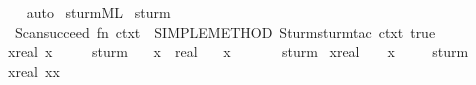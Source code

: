 \begin{isabellebody}
%
\isadelimproof
\ \ %
\endisadelimproof
%
\isatagproof
{}\isamarkupfalse%
\ auto%
\endisatagproof
{\isafoldproof}%
%
\isadelimproof
\isanewline
%
\endisadelimproof
\isanewline
%
\isadelimML
\isanewline
%
\endisadelimML
%
\isatagML
{}\isamarkupfalse%
\ {\isachardoublequoteopen}sturm{\isachardot}ML{\isachardoublequoteclose}\isanewline
\isanewline
{}\isamarkupfalse%
\ sturm\ {\isacharequal}\ {\isacharverbatimopen}\isanewline
\ \ Scan{\isachardot}succeed\ {\isacharparenleft}fn\ ctxt\ {\isacharequal}{\isachargreater}\ SIMPLE{\isacharunderscore}METHOD{\isacharprime}\ {\isacharparenleft}Sturm{\isachardot}sturm{\isacharunderscore}tac\ ctxt\ true{\isacharparenright}{\isacharparenright}\isanewline
{\isacharverbatimclose}%
\endisatagML
{\isafoldML}%
%
\isadelimML
\isanewline
%
\endisadelimML
\isanewline
{}\isamarkupfalse%
\isanewline
\ {\isachardoublequoteopen}{\isasymforall}x{\isacharcolon}{\isacharcolon}real{\isachardot}\ x{\isacharcircum}{}\ {\isacharplus}\ {}\ {\isasymnoteq}\ {}{\isachardoublequoteclose}\isanewline
%
\isadelimproof
%
\endisadelimproof
%
\isatagproof
{}\isamarkupfalse%
\ sturm%
\endisatagproof
{\isafoldproof}%
%
\isadelimproof
\isanewline
%
\endisadelimproof
\isanewline
{}\isamarkupfalse%
\isanewline
\ \ \ x\ {\isacharcolon}{\isacharcolon}\ real\isanewline
\ \ \ {\isachardoublequoteopen}x{\isacharcircum}{}\ {\isacharplus}\ {}\ {\isasymnoteq}\ {}{\isachardoublequoteclose}%
\isadelimproof
\ %
\endisadelimproof
%
\isatagproof
{}\isamarkupfalse%
\ sturm%
\endisatagproof
{\isafoldproof}%
%
\isadelimproof
%
\endisadelimproof
\isanewline
\isanewline
{}\isamarkupfalse%
\ {\isachardoublequoteopen}{\isacharparenleft}x{\isacharcolon}{\isacharcolon}real{\isacharparenright}\ {\isachargreater}\ {}\ {\isasymLongrightarrow}\ x{\isacharcircum}{}\ {\isachargreater}\ {}{\isachardoublequoteclose}%
\isadelimproof
\ %
\endisadelimproof
%
\isatagproof
{}\isamarkupfalse%
\ sturm%
\endisatagproof
{\isafoldproof}%
%
\isadelimproof
%
\endisadelimproof
\isanewline
\isanewline
{}\isamarkupfalse%
\ {\isachardoublequoteopen}{\isasymforall}x{\isacharcolon}{\isacharcolon}real{\isachardot}\ x{\isacharasterisk}x\ {\isasymnoteq}\ {\isacharminus}{}{\isachardoublequoteclose}%
\isadelimproof
\ %
\endisadelimproof
%
\isatagproof
{}\isamarkupfalse%

\end{isabellebody}
